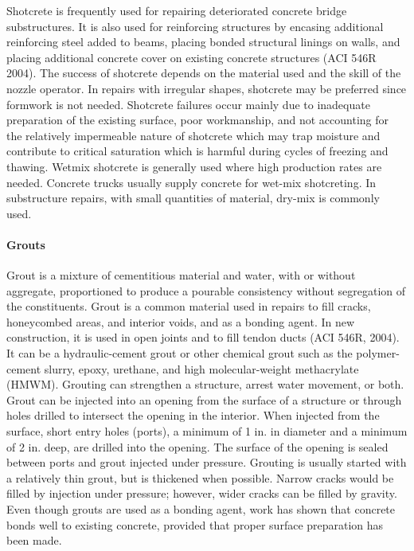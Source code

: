 Shotcrete is frequently used for repairing deteriorated concrete bridge substructures. It is also used for reinforcing structures by encasing additional reinforcing steel added to beams, placing bonded structural linings on walls, and placing additional concrete cover on existing concrete structures (ACI 546R 2004). The success of shotcrete depends on the material used and the skill of the nozzle operator. In repairs with irregular shapes, shotcrete may be preferred since formwork is not needed. Shotcrete failures occur mainly due to inadequate preparation of the existing surface, poor workmanship, and not accounting for the relatively impermeable nature of shotcrete which may trap moisture and contribute to critical saturation which is harmful during cycles of freezing and thawing. Wetmix shotcrete is generally used where high production rates are needed. Concrete trucks usually supply concrete for wet-mix shotcreting. In substructure repairs, with small quantities of material, dry-mix is commonly used.

\paragraph{Grouts}
Grout is a mixture of cementitious material and water, with or without aggregate, proportioned to produce a pourable consistency without segregation of the constituents. Grout is a common material used in repairs to fill cracks, honeycombed areas, and interior voids, and as a bonding agent. In new construction, it is used in open joints and to fill tendon ducts (ACI 546R, 2004). It can be a hydraulic-cement grout or other chemical grout such as the polymer-cement slurry, epoxy, urethane, and high molecular-weight methacrylate (HMWM). Grouting can strengthen a structure, arrest water movement, or both. Grout can be injected into an opening from the surface of a structure or through holes drilled to intersect the opening in the interior. When injected from the surface, short entry holes (ports), a minimum of 1 in. in diameter and a minimum of 2 in. deep, are drilled into the opening. The surface of the opening is sealed between ports and grout injected under pressure. Grouting is usually started with a relatively thin grout, but is thickened when possible. Narrow cracks would be filled by injection under pressure; however, wider cracks can be filled by gravity. Even though grouts are used as a bonding agent, work has shown that concrete bonds well to existing concrete, provided that proper surface preparation has been made.


